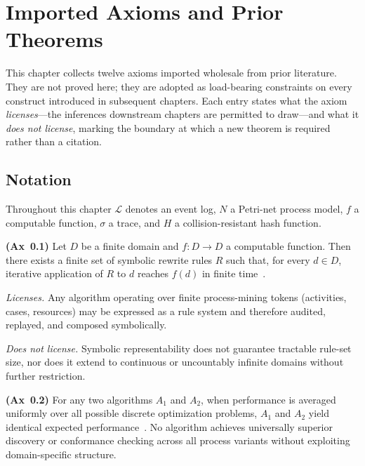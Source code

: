 
\chapter{Imported Axioms and Prior Theorems}
\label{chap:axioms}
\label{chap:imported-axioms}

This chapter collects twelve axioms imported wholesale from prior literature.
They are not proved here; they are adopted as load-bearing constraints on every
construct introduced in subsequent chapters.
Each entry states what the axiom \emph{licenses}—the inferences downstream
chapters are permitted to draw—and what it \emph{does not license}, marking the
boundary at which a new theorem is required rather than a citation.

\section*{Notation}
Throughout this chapter $\mathcal{L}$ denotes an event log, $N$ a Petri-net
process model, $f$ a computable function, $\sigma$ a trace, and $H$ a
collision-resistant hash function.

\begin{axiom}\label{ax:symbolic}
\textbf{(Ax~0.1)}
Let $D$ be a finite domain and $f : D \to D$ a computable function.
Then there exists a finite set of symbolic rewrite rules $R$ such that,
for every $d \in D$, iterative application of $R$ to $d$ reaches $f(d)$ in
finite time~\cite{robinson1965}.
\end{axiom}

\noindent\textit{Licenses.}
Any algorithm operating over finite process-mining tokens (activities, cases,
resources) may be expressed as a rule system and therefore audited, replayed,
and composed symbolically.

\noindent\textit{Does not license.}
Symbolic representability does not guarantee tractable rule-set size, nor does
it extend to continuous or uncountably infinite domains without further
restriction.

\begin{axiom}\label{ax:nfl}
\textbf{(Ax~0.2)}
For any two algorithms $A_1$ and $A_2$, when performance is averaged uniformly
over all possible discrete optimization problems, $A_1$ and $A_2$ yield
identical expected performance~\cite{wolpert1997nfl}.
No algorithm achieves universally superior discovery or conformance checking
across all process variants without exploiting domain-specific structure.
\end{axiom}

